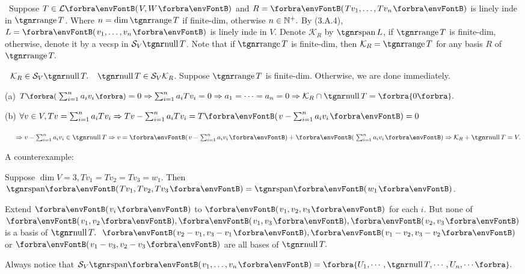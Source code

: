\documentclass[a4paper, 11pt, UTF8]{article}
\begin{document}
\begin{large}
\BulletPoint \,\hspace{1pt}\NewNotation\TextB{}
Suppose $T\in\Lm{V,W}$ and $R=\Par{Tv_1,\dots,Tv_n}$ is linely inde in $\range T$.\TextB{}
Where $n=\dim\range T$ if finite-dim, otherwise $n\in{\mathbb{N}^+}.$\TextB{}
By (3.A.4), $L=\Par{v_1,\dots,v_n}$ is linely inde in $V$.\TextB{}
Denote $\mathcal{K}_R$ by $\Spn L$, if $\range T$ is finite-dim, otherwise, denote it by a vecsp in $\mathcal{S}_V\null T$.\TextB{}
Note that if $\range T$ is finite-dim, then $\mathcal{K}_R=\range T$ for any basis $R$ of $\range T.$\par\vspace{6pt}
\BulletPoint \,\hspace{1pt}\NewTheorem\,\,\,{\Large$\mathcal{K}_R\in\mathcal{S}_V\null T.$} \qquad\Comment\,\,\,$\null T\in\mathcal{S}_V \mathcal{K}_R$.\TextB{}
Suppose $\range T$ is finite-dim. Otherwise, we are done immediately.\par\vspace{6pt}\TextB{}
(a) $T\BigPar{\sum_{i=1}^n a_i v_i}=0\Rightarrow \sum_{i=1}^n a_i Tv_i=0\Rightarrow a_1=\dots=a_n=0\Rightarrow\mathcal{K}_R\cap\null T=\zeroSubs.$\par\vspace{6pt}\TextB{}
(b) $\forall v\in V, Tv=\sum_{i=1}^n a_i Tv_i\Rightarrow Tv-\sum_{i=1}^n a_i Tv_i=T\Par{v-\sum_{i=1}^n a_i v_i}=0$\par\vspace{6pt}\TextB{}
$\Hb\Rightarrow v-\sum_{i=1}^n a_i v_i\in\null T\Rightarrow v=\Par{v-\sum_{i=1}^n a_i v_i}+\Par{\sum_{i=1}^n a_i v_i}\Rightarrow\mathcal{K}_R+\null T=V.$\PfEnd
\SepLine

A counterexample:\par\quad
Suppose $\dim V=3, Tv_1=Tv_2=Tv_3=w_1.$ Then $\Span{Tv_1,Tv_2,Tv_3}=\Span{w_1}$.\par\quad
Extend $\Par{v_i}$ to $\Par{v_1,v_2,v_3}$ for each $i$. But none of $\Par{v_1,v_2},\Par{v_1,v_3},\Par{v_2,v_3}$ is a basis of $\null T.$\PfEnd[-15pt]
\Comment \,\,\,$\Par{v_2-v_1,v_3-v_1},\Par{v_1-v_2,v_3-v_2}$ or $\Par{v_1-v_3,v_2-v_3}$ are all bases of $\null T.$\par\Blind{\Comment\,\,}
Always notice that $\mathcal{S}_V\Span{v_1,\dots,v_n}=\Bra{U_1,\cdots,\null T,\cdots,U_n,\cdots}.$\par
\SepLine


\end{large}
\end{document}
